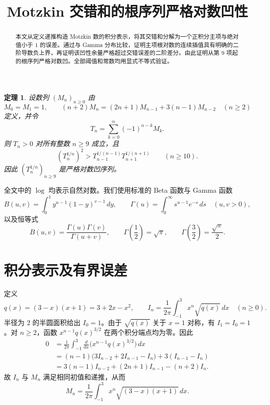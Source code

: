 \documentclass[UTF8,fontset=fandol,11pt]{ctexart}
\title{Motzkin 交错和的根序列严格对数凹性}
\author{}
\date{}
\newtheorem{theorem}{定理}
\begin{document}
\maketitle

\begin{abstract}
本文从定义递推构造 Motzkin 数的积分表示，将其交错和分解为一个正积分主项与绝对值小于 $1$ 的误差。通过与 Gamma 分布比较，证明主项根对数的连续插值具有明确的二阶导数负上界，再证明该凹性余量严格超过交错误差的二阶差分。由此证明从第 $9$ 项起的根序列严格对数凹。全部阈值和常数均用显式不等式验证。
\end{abstract}

\begin{theorem}\label{thm:main}
设数列 $(M_n)_{n\ge0}$ 由
\[
M_0=M_1=1,
\qquad
(n+2)M_n=(2n+1)M_{n-1}+3(n-1)M_{n-2}
\quad(n\ge2)
\]
定义，并令
\[
T_n=\sum_{k=0}^{n}(-1)^{n-k}M_k.
\]
则 $T_n>0$ 对所有整数 $n\ge9$ 成立，且
\begin{equation}\label{eq:conclusion}
\left(T_n^{1/n}\right)^2
>T_{n-1}^{1/(n-1)}T_{n+1}^{1/(n+1)}
\qquad(n\ge10).
\end{equation}
因此 $(T_n^{1/n})_{n\ge9}$ 是严格对数凹序列。
\end{theorem}

全文中的 $\log$ 均表示自然对数。我们使用标准的 Beta 函数与 Gamma 函数
\[
B(u,v)=\int_0^1 y^{u-1}(1-y)^{v-1}\,dy,
\qquad
\Gamma(u)=\int_0^\infty s^{u-1}e^{-s}\,ds
\quad(u,v>0),
\]
以及恒等式
\[
B(u,v)=\frac{\Gamma(u)\Gamma(v)}{\Gamma(u+v)},
\qquad
\Gamma\left(\frac12\right)=\sqrt\pi,
\qquad
\Gamma\left(\frac32\right)=\frac{\sqrt\pi}{2}.
\]

\section{积分表示及有界误差}

定义
\[
q(x)=(3-x)(x+1)=3+2x-x^2,
\qquad
I_n=\frac1{2\pi}\int_{-1}^{3}x^n\sqrt{q(x)}\,dx
\quad(n\ge0).
\]
半径为 $2$ 的半圆面积给出 $I_0=1$。由于 $\sqrt{q(x)}$ 关于 $x=1$ 对称，有 $I_1=I_0=1$。对 $n\ge2$，函数 $x^{n-1}q(x)^{3/2}$ 在两个积分端点均为零。因此
\begin{align*}
0
&=\frac1{2\pi}\int_{-1}^{3}
  \frac{d}{dx}\bigl(x^{n-1}q(x)^{3/2}\bigr)\,dx\\
&=(n-1)\bigl(3I_{n-2}+2I_{n-1}-I_n\bigr)
  +3(I_{n-1}-I_n)\\
&=3(n-1)I_{n-2}+(2n+1)I_{n-1}-(n+2)I_n.
\end{align*}
故 $I_n$ 与 $M_n$ 满足相同初值和递推，从而
\begin{equation}\label{eq:moment}
M_n=\frac1{2\pi}\int_{-1}^{3}x^n\sqrt{(3-x)(x+1)}\,dx.
\end{equation}
\end{document}
